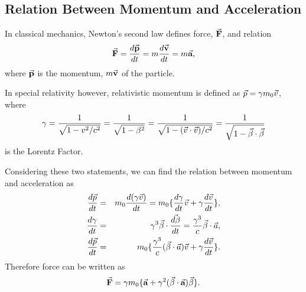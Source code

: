 \documentclass[a4paper,oneside,12pt]{report}
\numberwithin{equation}{chapter}
\begin{document}
\subsection{Relation Between Momentum and Acceleration}
In classical mechanics, Newton's second law defines force, $\vec{\textbf{F}}$, and relation
\vspace{-10pt}
\begin{equation} \label{eq:newton_second_law}
    \vecthreeBF{F} = \frac{d \vecthreeBF{p}}{d t} = m \frac{d \vecthreeBF{v}}{d t} = m \vecthreeBF{a}   ,
    \vspace{-10pt}
\end{equation}
where $\vec{\textbf{p}}$ is the momentum, $m\vec{\textbf{v}}$ of the particle. 


In special relativity however, relativistic momentum is defined as $\vec{p} = \gamma m_0 \vec{v} $, where 
\vspace{-10pt}
\begin{equation}
    \gamma = \frac{1}{\sqrt{1-v^2 / c^2}} = \frac{1}{\sqrt{1-\beta^2}}
            = \frac{1}{\sqrt{1- (\dotProd{v}{v})/ c^2}} =  \frac{1}{\sqrt{1- \dotProd{\beta}{\beta}}}
            \vspace{-10pt}
\end{equation} is the Lorentz Factor.


Considering these two statements, we can find the relation between momentum and acceleration as 
\vspace{-15pt}
\begin{eqnarray}
    \deriv{\vecthree{p}}{t} &=& m_0 \deriv{(\gamma \vecthree{v})}{t} = m_0 \{  \deriv{\gamma}{t}\vecthree{v} + \gamma \deriv{\vecthree{v}}{t}   \} ,\\
    \deriv{\gamma}{t} &=& \gamma^3 \dotProd{\beta}{\deriv{\beta}{t}} = \frac{\gamma^3}{c} \dotProd{\beta}{a}   , \\
    \deriv{\vecthree{p}}{t}  &=& m_0 \{   \frac{\gamma^3}{c} (\dotProd{\beta}{a} )\vecthree{v} + \gamma \deriv{\vecthree{v}}{t}  \} .
    \vspace{-15pt}
\end{eqnarray}
\vspace{-35pt}
\newline
Therefore force can be written as
\vspace{-20pt}
\begin{equation} \label{eq:Frel}
    \vecthreeBF{F}  = \gamma m_0 \{ \vecthreeBF{a} + \gamma^2(\dotProd{\beta}{\textbf{a}})\vecthree{\beta} \} .
    \vspace{-15pt}
\end{equation}
\end{document}
